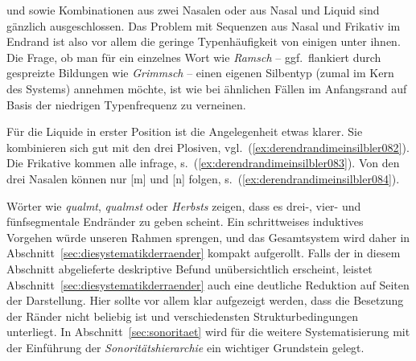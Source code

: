 \begin{exe}
  \ex\label{ex:derendrandimeinsilbler074}
  \begin{xlist}
  \end{xlist}
\end{exe}

\textipa{[mf]} und \textipa{[Nf]} sowie Kombinationen aus zwei Nasalen oder aus Nasal und Liquid sind gänzlich ausgeschlossen.
Das Problem mit Sequenzen aus Nasal und Frikativ im Endrand ist also vor allem die geringe Typenhäufigkeit von einigen unter ihnen.
Die Frage, ob man \zB für ein einzelnes Wort wie \textit{Ramsch} -- ggf.\ flankiert durch gespreizte Bildungen wie \textit{Grimmsch} -- einen eigenen Silbentyp (zumal im Kern des Systems) annehmen möchte, ist wie bei ähnlichen Fällen im Anfangsrand auf Basis der niedrigen Typenfrequenz zu verneinen.

Für die Liquide in erster Position ist die Angelegenheit etwas klarer.
Sie kombinieren sich gut mit den drei Plosiven, vgl.\ (\ref{ex:derendrandimeinsilbler082}).
Die Frikative kommen alle infrage, s.\ (\ref{ex:derendrandimeinsilbler083}).
Von den drei Nasalen können nur [m] und [n] folgen, s.\ (\ref{ex:derendrandimeinsilbler084}).

\begin{exe}
  \ex\label{ex:derendrandimeinsilbler081}
  \begin{xlist}
  \end{xlist}
\end{exe}

Wörter wie \textit{qualmt}, \textit{qualmst} oder \textit{Herbsts} zeigen, dass es drei-, vier- und fünfsegmentale Endränder zu geben scheint.
Ein schrittweises induktives Vorgehen würde unseren Rahmen sprengen, und das Gesamtsystem wird daher in Abschnitt~\ref{sec:diesystematikderraender} kompakt aufgerollt.
Falls der in diesem Abschnitt abgelieferte deskriptive Befund unübersichtlich erscheint, leistet Abschnitt~\ref{sec:diesystematikderraender} auch eine deutliche Reduktion auf Seiten der Darstellung.
Hier sollte vor allem klar aufgezeigt werden, dass die Besetzung der Ränder nicht beliebig ist und verschiedensten Strukturbedingungen unterliegt.
In Abschnitt~\ref{sec:sonoritaet} wird für die weitere Systematisierung mit der Einführung der \textit{Sonoritätshierarchie} ein wichtiger Grundstein gelegt.

